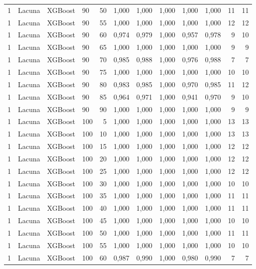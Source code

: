 \begin{longtable}{ccclrrrrrrrr}
1 & Lacuna & XGBoost & 90 & 50 & 1,000 & 1,000 & 1,000 & 1,000 & 1,000 & 11 & 11 \\
1 & Lacuna & XGBoost & 90 & 55 & 1,000 & 1,000 & 1,000 & 1,000 & 1,000 & 12 & 12 \\
1 & Lacuna & XGBoost & 90 & 60 & 0,974 & 0,979 & 1,000 & 0,957 & 0,978 & 9 & 10 \\
1 & Lacuna & XGBoost & 90 & 65 & 1,000 & 1,000 & 1,000 & 1,000 & 1,000 & 9 & 9 \\
1 & Lacuna & XGBoost & 90 & 70 & 0,985 & 0,988 & 1,000 & 0,976 & 0,988 & 7 & 7 \\
1 & Lacuna & XGBoost & 90 & 75 & 1,000 & 1,000 & 1,000 & 1,000 & 1,000 & 10 & 10 \\
1 & Lacuna & XGBoost & 90 & 80 & 0,983 & 0,985 & 1,000 & 0,970 & 0,985 & 11 & 12 \\
1 & Lacuna & XGBoost & 90 & 85 & 0,964 & 0,971 & 1,000 & 0,941 & 0,970 & 9 & 10 \\
1 & Lacuna & XGBoost & 90 & 90 & 1,000 & 1,000 & 1,000 & 1,000 & 1,000 & 9 & 9 \\
1 & Lacuna & XGBoost & 100 & 5 & 1,000 & 1,000 & 1,000 & 1,000 & 1,000 & 13 & 13 \\
1 & Lacuna & XGBoost & 100 & 10 & 1,000 & 1,000 & 1,000 & 1,000 & 1,000 & 13 & 13 \\
1 & Lacuna & XGBoost & 100 & 15 & 1,000 & 1,000 & 1,000 & 1,000 & 1,000 & 12 & 12 \\
1 & Lacuna & XGBoost & 100 & 20 & 1,000 & 1,000 & 1,000 & 1,000 & 1,000 & 12 & 12 \\
1 & Lacuna & XGBoost & 100 & 25 & 1,000 & 1,000 & 1,000 & 1,000 & 1,000 & 12 & 12 \\
1 & Lacuna & XGBoost & 100 & 30 & 1,000 & 1,000 & 1,000 & 1,000 & 1,000 & 10 & 10 \\
1 & Lacuna & XGBoost & 100 & 35 & 1,000 & 1,000 & 1,000 & 1,000 & 1,000 & 11 & 11 \\
1 & Lacuna & XGBoost & 100 & 40 & 1,000 & 1,000 & 1,000 & 1,000 & 1,000 & 11 & 11 \\
1 & Lacuna & XGBoost & 100 & 45 & 1,000 & 1,000 & 1,000 & 1,000 & 1,000 & 10 & 10 \\
1 & Lacuna & XGBoost & 100 & 50 & 1,000 & 1,000 & 1,000 & 1,000 & 1,000 & 11 & 11 \\
1 & Lacuna & XGBoost & 100 & 55 & 1,000 & 1,000 & 1,000 & 1,000 & 1,000 & 10 & 10 \\
1 & Lacuna & XGBoost & 100 & 60 & 0,987 & 0,990 & 1,000 & 0,980 & 0,990 & 7 & 7 \\

\end{longtable}

